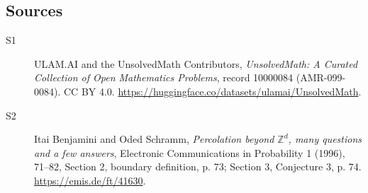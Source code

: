 \documentclass[11pt]{article}
\begin{document}
\subsection{Sources}
\begin{description}
\item[\hypertarget{source:10000084:1}{S1}] ULAM.AI and the UnsolvedMath Contributors, \emph{UnsolvedMath: A Curated Collection of Open Mathematics Problems}, record 10000084 (AMR-099-0084). CC BY 4.0. \url{https://huggingface.co/datasets/ulamai/UnsolvedMath}.
\item[\hypertarget{source:10000084:2}{S2}] Itai Benjamini and Oded Schramm, \emph{Percolation beyond $\mathbb Z^d$, many questions and a few answers}, Electronic Communications in Probability 1 (1996), 71--82, Section 2, boundary definition, p. 73; Section 3, Conjecture 3, p. 74. \url{https://emis.de/ft/41630}.
\end{description}
\label{end:10000084}
\end{document}
